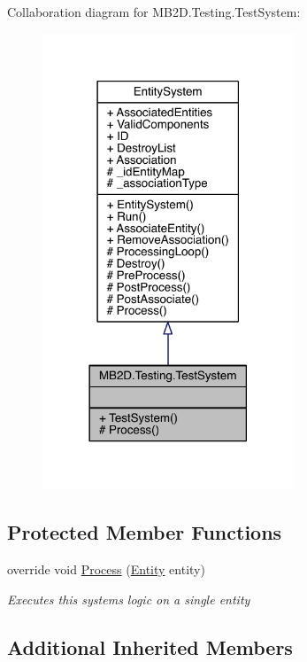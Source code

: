 Collaboration diagram for M\+B2\+D.\+Testing.\+Test\+System\+:\nopagebreak
\begin{figure}[H]
\begin{center}
\leavevmode
\includegraphics[width=213pt]{class_m_b2_d_1_1_testing_1_1_test_system__coll__graph}
\end{center}
\end{figure}
\subsection*{Protected Member Functions}
\begin{DoxyCompactItemize}
\item 
override void \hyperlink{class_m_b2_d_1_1_testing_1_1_test_system_a35d160e6e7e8ffb8f1a6cf403b00ef40}{Process} (\hyperlink{class_m_b2_d_1_1_entity_component_1_1_entity}{Entity} entity)
\begin{DoxyCompactList}\small\item\em Executes this systems logic on a single entity \end{DoxyCompactList}\end{DoxyCompactItemize}
\subsection*{Additional Inherited Members}


